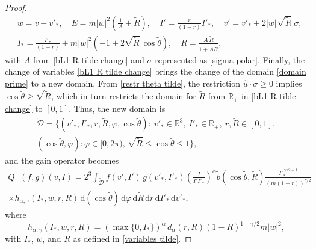 \documentclass[11pt,a4paper]{amsart}
\newcommand{\md}{\mathrm{d}}
\newcommand{\dpo}{d_\alpha(r,R)}
\newcommand{\g}{\gamma}
\newcommand{\Dt}{\tilde{\mathcal{D}}}
\newcommand{\A}{A}
\newcommand{\B}{B}
\newcommand{\hag}{h_{\alpha,\g}}
\begin{document}
\begin{proof}
\begin{equation}\label{variables tilde}
	\begin{split}
	& w=v-v'_*, \quad E = m |w|^2 \left(\frac{1}{A} +  \tilde{R}\right), \quad  I'=\frac{r}{(1-r)}I'_*, \quad v' = v'_* +2 |w| \sqrt{\tilde{R}}  \ \sigma, \\
&	I_* = \frac{I'_*}{(1-r)} +m |w|^2 \left( -1 + 2 \sqrt{\tilde{R}} 
	\, \cos\tilde{\theta} \right), \quad  R = \frac{ \A \, \tilde{R}}{1+\A \tilde{R}},
	\end{split}
\end{equation}
with $\A$ from \eqref{bL1 R tilde change} and $\sigma$ represented as \eqref{sigma polar}. 
Finally, the change of variables \eqref{bL1 R tilde change} brings the change of the domain \eqref{domain prime} to a new domain. From \eqref{restr theta tilde},   the restriction $\hat{u}\cdot\sigma\geq 0$ implies $\cos\tilde{\theta}\geq \sqrt{\tilde{R}}$, which in turn restricts the domain for $\tilde{R}$ from $\mathbb{R}_+$ in \eqref{bL1 R tilde change} to $[0,1]$.  
Thus, the new domain is
\begin{multline}\label{domain Dt}
	\Dt = \Bigg\{  (v'_*,I'_*,r,\tilde{R}, \varphi, \cos\tilde{\theta}): \ v'_* \in \mathbb{R}^3,\ I'_*\in\mathbb{R}_+, \ r, \tilde{R} \in[0,1],
	 \\ (\cos\tilde{\theta},\varphi) :   \varphi \in [0, 2\pi), \, \sqrt{\tilde{R}}\leq \cos\tilde{\theta}\leq 1 \Bigg\},
\end{multline}
and the gain operator becomes
	\begin{multline}\label{coll gain operator tilde}
	Q^+(f,g)(v,I) = 2^3 \int_{	\Dt}  f(v',I') \, g(v'_*,I'_*) \left(\frac{I }{I' I'_* }\right)^{\alpha}  \tilde{b}(\cos\tilde{\theta},\tilde{R})    \frac{I'^{\,\g/2-1}_*}{(m(1-r))^{\g/2}} \\ \times 	\hag(I_*, w, r, R) \, 
	\md (\cos\tilde{\theta}) \, \md \varphi \, \md \tilde{R} \, \md r \, \md I'_* \, \md v'_*,
\end{multline}
where 
\begin{equation}\label{h}
	\hag(I_*, w, r, R) =( \max\{0, I_*\})^\alpha \, \dpo (1-R)^{1-\g/2} m |w|^2,
\end{equation}
with $I_*$, $w$, and $R$ as defined in \eqref{variables tilde}. 



\end{proof}
\end{document}
